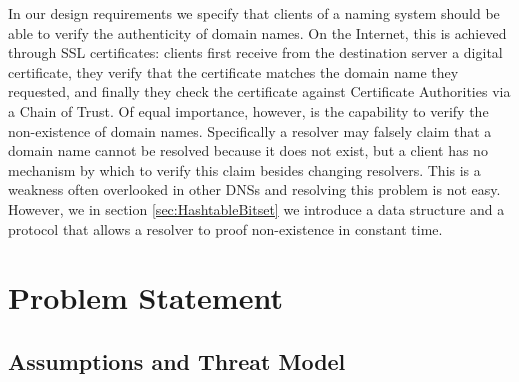 \documentclass{sig-alternate}
\begin{document}
In our design requirements we specify that clients of a naming system should be able to verify the authenticity of domain names. On the Internet, this is achieved through SSL certificates: clients first receive from the destination server a digital certificate, they verify that the certificate matches the domain name they requested, and finally they check the certificate against Certificate Authorities via a Chain of Trust. Of equal importance, however, is the capability to verify the non-existence of domain names. Specifically a resolver may falsely claim that a domain name cannot be resolved because it does not exist, but a client has no mechanism by which to verify this claim besides changing resolvers. This is a weakness often overlooked in other DNSs and resolving this problem is not easy. However, we in section \ref{sec:HashtableBitset} we introduce a data structure and a protocol that allows a resolver to proof non-existence in constant time.

\section{Problem Statement}

\subsection{Assumptions and Threat Model}
\end{document}
